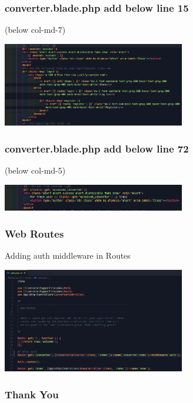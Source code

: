 \documentclass[aspectratio=169, table]{beamer}
\begin{document}
\begin{frame}[fragile]
 \frametitle{converter.blade.php add below line 15}
(below col-md-7)
 \vskip1cm
 \begin{center}
  \includegraphics[width=0.6\textwidth]{classFiles/pertemuan-11-view-part-1.png}
 \end{center}
\end{frame}

\begin{frame}[fragile]
 \frametitle{converter.blade.php add below line 72}
(below col-md-5)
 \vskip1cm
 \begin{center}
  \includegraphics[width=0.6\textwidth]{classFiles/pertemuan-11-view-part-2.png}
 \end{center}
\end{frame}

\begin{frame}[fragile]
 \frametitle{Web Routes}
Adding auth middleware in Routes
 \vskip1cm
 \begin{center}
  \includegraphics[width=0.6\textwidth]{classFiles/pertemuan-11-routes.png}
 \end{center}
\end{frame}

\begin{frame4}
    \frametitle{Thank You}
\end{frame4}
\end{document}
